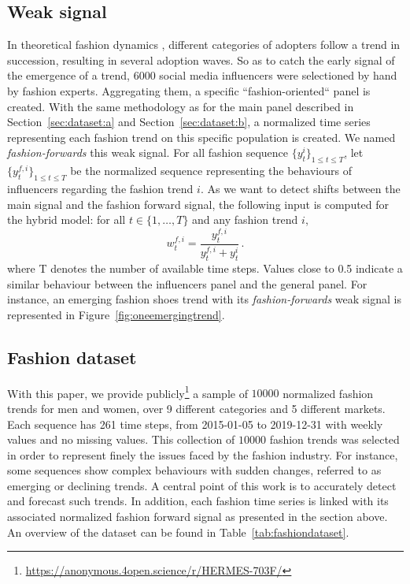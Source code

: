 \documentclass[10pt]{article} %
\newcommand{\ts}{y}
\newcommand{\ws}{w}
\newcommand{\numberts}{10000}
\begin{document}
\subsection{Weak signal}

In theoretical fashion dynamics \citep{rogers1962}, different categories of adopters follow a trend in succession, resulting in several adoption waves.
So as to catch the early signal of the emergence of a trend, 6000 social media influencers were selectioned by hand by fashion experts. Aggregating them, a specific ``fashion-oriented`` panel is created. With the same methodology as for the main panel described in Section~\ref{sec:dataset:a} and Section~\ref{sec:dataset:b}, a normalized time series representing each fashion trend on this specific population is created. We named \textit{fashion-forwards} this weak signal.  For all fashion sequence $\{y^i_t\}_{1 \leq t \leq T}$, let $\{\ts^{f,i}_t\}_{1 \leq t \leq T}$ be the normalized sequence representing the behaviours of influencers regarding the fashion trend $i$. As we want to detect shifts between the main signal and the fashion forward signal, the following input is computed for the hybrid model: for all $t \in \{1,\ldots,T\}$ and any fashion trend $i$,
$$
\ws^{f,i}_{t} = \frac{\ts_t^{f,i}}{\ts_t^{f,i}+\ts_t^{i}}\,.
$$
where T denotes the number of available time steps. Values close to 0.5 indicate a similar behaviour between the influencers panel and the general panel. For instance, an  emerging fashion shoes trend with its \textit{fashion-forwards} weak signal is represented in Figure~\ref{fig:oneemergingtrend}. 

\subsection{Fashion dataset}

With this paper, we provide publicly\footnote[1]{\url{https://anonymous.4open.science/r/HERMES-703F/}} a sample of $\numberts$ normalized fashion trends for men and women, over 9 different categories and 5 different markets. Each sequence has 261 time steps, from 2015-01-05 to 2019-12-31 with weekly values and no missing values. This collection of $\numberts$ fashion trends was selected in order to represent finely the issues faced by the fashion industry. For instance, some sequences show complex behaviours with sudden changes, referred to as emerging or declining trends. A central point of this work is to accurately detect and forecast such trends. In addition, each fashion time series is linked with its associated normalized fashion forward signal as presented in the section above. An overview of the dataset can be found in Table~\ref{tab:fashiondataset}. 
\end{document}
